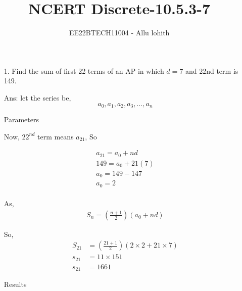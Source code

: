 \documentclass[journal,12pt,twocolumn]{IEEEtran}
\theoremstyle{remark}
\begin{document}

\vspace{3cm}

\title{NCERT Discrete-10.5.3-7}
\author{EE22BTECH11004 - Allu lohith}

\maketitle
\newpage
\bigskip

\renewcommand{\thefigure}{\theenumi}
\renewcommand{\thetable}{\theenumi}
\begin{enumerate}
\item[1.]
Find the sum of first 22 terms of an AP in which $d = 7$ and 22nd term is 149.
\item[Ans:]
let the series be, $$a_0,a_1,a_2,a_3,...,a_n$$

\begin{table}[h!]
\centering

\vspace{0.5cm}
\caption{\normalsize Parameters}
\end{table}

Now, $22^{nd}$ term means $a_{21}$, So

\begin{align}
a_{21}= a_0+nd\\
149= a_0+21(7)\\
a_0=149-147\\
 a_0=2    
\end{align}\\
As,
\begin{align}
S_n=\left(\frac{n+1}{2}\right) (a_0+nd)    
\end{align}

So, 
\begin{align}
S_{21}&=\left(\frac{21+1}{2}\right)(2\times2+21\times7)\\
s_{21}&=11\times151\\
s_{21}&=1661
\end{align}

\begin{table}[h!]
\centering

\vspace{0.5cm}
\caption{\normalsize Results}
\end{table}

\end{enumerate}
\end{document}
